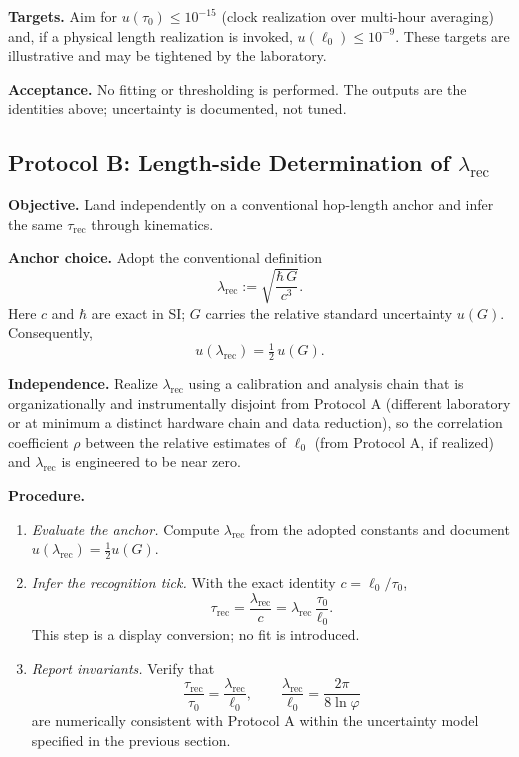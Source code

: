 \documentclass[11pt]{article}
\theoremstyle{plain}
\theoremstyle{definition}
\theoremstyle{remark}
\begin{document}
\textbf{Targets.} Aim for \(u(\tau_{0})\le 10^{-15}\) (clock realization over multi-hour averaging) and, if a physical length realization is invoked, \(u(\ell_{0})\le 10^{-9}\). These targets are illustrative and may be tightened by the laboratory.

\textbf{Acceptance.} No fitting or thresholding is performed. The outputs are the identities above; uncertainty is documented, not tuned.

\medskip

\subsection*{Protocol B: Length-side Determination of \(\lambda_{\mathrm{rec}}\)}
\textbf{Objective.} Land independently on a conventional hop-length anchor and infer the same \(\tau_{\mathrm{rec}}\) through kinematics.

\textbf{Anchor choice.} Adopt the conventional definition
\[
\lambda_{\mathrm{rec}}:=\sqrt{\frac{\hbar\,G}{c^{3}}}.
\]
Here \(c\) and \(\hbar\) are exact in SI; \(G\) carries the relative standard uncertainty \(u(G)\). Consequently,
\[
u(\lambda_{\mathrm{rec}})=\tfrac12\,u(G).
\]

\textbf{Independence.} Realize \(\lambda_{\mathrm{rec}}\) using a calibration and analysis chain that is organizationally and instrumentally disjoint from Protocol A (different laboratory or at minimum a distinct hardware chain and data reduction), so the correlation coefficient \(\rho\) between the relative estimates of \(\ell_{0}\) (from Protocol A, if realized) and \(\lambda_{\mathrm{rec}}\) is engineered to be near zero.

\textbf{Procedure.}
\begin{enumerate}
  \item \emph{Evaluate the anchor.} Compute \(\lambda_{\mathrm{rec}}\) from the adopted constants and document \(u(\lambda_{\mathrm{rec}})=\tfrac12 u(G)\).
  \item \emph{Infer the recognition tick.} With the exact identity \(c=\ell_{0}/\tau_{0}\),
  \[
  \tau_{\mathrm{rec}}=\frac{\lambda_{\mathrm{rec}}}{c}=\lambda_{\mathrm{rec}}\ \frac{\tau_{0}}{\ell_{0}}.
  \]
  This step is a display conversion; no fit is introduced.
  \item \emph{Report invariants.} Verify that
  \[
  \frac{\tau_{\mathrm{rec}}}{\tau_{0}}=\frac{\lambda_{\mathrm{rec}}}{\ell_{0}},\qquad
  \frac{\lambda_{\mathrm{rec}}}{\ell_{0}}=\frac{2\pi}{8\ln\varphi}
  \]
  are numerically consistent with Protocol A within the uncertainty model specified in the previous section.
\end{enumerate}
\end{document}
